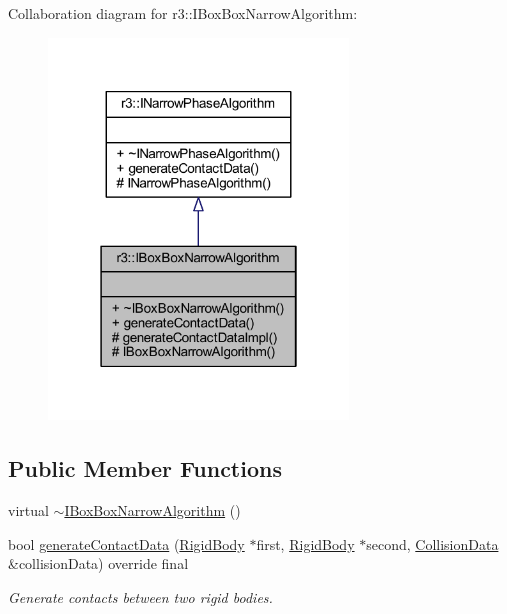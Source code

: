 Collaboration diagram for r3\+:\+:I\+Box\+Box\+Narrow\+Algorithm\+:\nopagebreak
\begin{figure}[H]
\begin{center}
\leavevmode
\includegraphics[width=226pt]{classr3_1_1_i_box_box_narrow_algorithm__coll__graph}
\end{center}
\end{figure}
\subsection*{Public Member Functions}
\begin{DoxyCompactItemize}
\item 
virtual \mbox{\hyperlink{classr3_1_1_i_box_box_narrow_algorithm_a384c60f79ed845100877e62d7e2a10f4}{$\sim$\+I\+Box\+Box\+Narrow\+Algorithm}} ()
\item 
bool \mbox{\hyperlink{classr3_1_1_i_box_box_narrow_algorithm_a4b06ee2be38c248c59195082db64c3e3}{generate\+Contact\+Data}} (\mbox{\hyperlink{classr3_1_1_rigid_body}{Rigid\+Body}} $\ast$first, \mbox{\hyperlink{classr3_1_1_rigid_body}{Rigid\+Body}} $\ast$second, \mbox{\hyperlink{classr3_1_1_collision_data}{Collision\+Data}} \&collision\+Data) override final
\begin{DoxyCompactList}\small\item\em Generate contacts between two rigid bodies. \end{DoxyCompactList}\end{DoxyCompactItemize}
